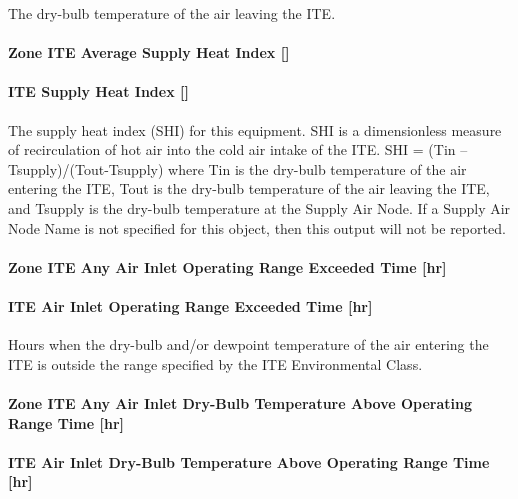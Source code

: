 The dry-bulb temperature of the air leaving the ITE.

\paragraph{Zone ITE Average Supply Heat Index {[]}}\label{zone-ite-average-supply-heat-index}

\paragraph{ITE Supply Heat Index {[]}}\label{ite-supply-heat-index}

The supply heat index (SHI) for this equipment. SHI is a dimensionless measure of recirculation of hot air into the cold air intake of the ITE. SHI = (Tin -- Tsupply)/(Tout-Tsupply) where Tin is the dry-bulb temperature of the air entering the ITE, Tout is the dry-bulb temperature of the air leaving the ITE, and Tsupply is the dry-bulb temperature at the Supply Air Node. If a Supply Air Node Name is not specified for this object, then this output will not be reported.

\paragraph{Zone ITE Any Air Inlet Operating Range Exceeded Time {[}hr{]}}\label{zone-ite-any-air-inlet-operating-range-exceeded-time-hr}

\paragraph{ITE Air Inlet Operating Range Exceeded Time {[}hr{]}}\label{ite-air-inlet-operating-range-exceeded-time-hr}

Hours when the dry-bulb and/or dewpoint temperature of the air entering the ITE is outside the range specified by the ITE Environmental Class.

\paragraph{Zone ITE Any Air Inlet Dry-Bulb Temperature Above Operating Range Time {[}hr{]}}\label{zone-ite-any-air-inlet-dry-bulb-temperature-above-operating-range-time-hr}

\paragraph{ITE Air Inlet Dry-Bulb Temperature Above Operating Range Time {[}hr{]}}\label{ite-air-inlet-dry-bulb-temperature-above-operating-range-time-hr}

